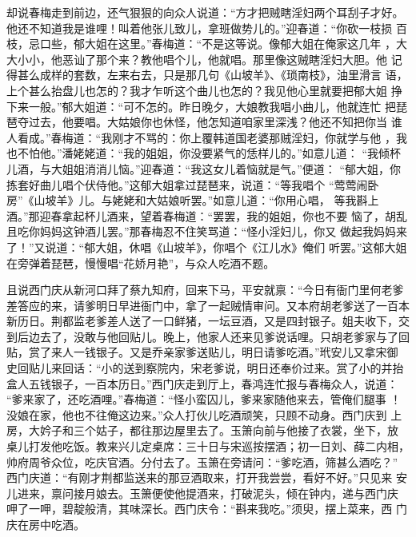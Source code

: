 却说春梅走到前边，还气狠狠的向众人说道：“方才把贼瞎淫妇两个耳刮子才好。
他还不知道我是谁哩！叫着他张儿致儿，拿班做势儿的。”迎春道：“你砍一枝损
百枝，忌口些，郁大姐在这里。”春梅道：“不是这等说。像郁大姐在俺家这几年
，大大小小，他恶讪了那个来？教他唱个儿，他就唱。那里像这贼瞎淫妇大胆。他
记得甚么成样的套数，左来右去，只是那几句《山坡羊》、《琐南枝》，油里滑言
语，上个甚么抬盘儿也怎的？我才乍听这个曲儿也怎的？我见他心里就要把郁大姐
挣下来一般。”郁大姐道：“可不怎的。昨日晚夕，大娘教我唱小曲儿，他就连忙
把琵琶夺过去，他要唱。大姑娘你也休怪，他怎知道咱家里深浅？他还不知把你当
谁人看成。”春梅道：“我刚才不骂的：你上覆韩道国老婆那贼淫妇，你就学与他
，我也不怕他。”潘姥姥道：“我的姐姐，你没要紧气的恁样儿的。”如意儿道：
“我倾杯儿酒，与大姐姐消消儿恼。”迎春道：“我这女儿着恼就是气。”便道：
“郁大姐，你拣套好曲儿唱个伏侍他。”这郁大姐拿过琵琶来，说道：“等我唱个
“莺莺闹卧房”《山坡羊》儿。与姥姥和大姑娘听罢。”如意儿道：“你用心唱，
等我斟上酒。”那迎春拿起杯儿酒来，望着春梅道：“罢罢，我的姐姐，你也不要
恼了，胡乱且吃你妈妈这钟酒儿罢。”那春梅忍不住笑骂道：“怪小淫妇儿，你又
做起我妈妈来了！”又说道：“郁大姐，休唱《山坡羊》，你唱个《江儿水》俺们
听罢。”这郁大姐在旁弹着琵琶，慢慢唱“花娇月艳”，与众人吃酒不题。

且说西门庆从新河口拜了蔡九知府，回来下马，平安就禀：“今日有衙门里何老爹
差答应的来，请爹明日早进衙门中，拿了一起贼情审问。又本府胡老爹送了一百本
新历日。荆都监老爹差人送了一口鲜猪，一坛豆酒，又是四封银子。姐夫收下，交
到后边去了，没敢与他回贴儿。晚上，他家人还来见爹说话哩。只胡老爹家与了回
贴，赏了来人一钱银子。又是乔亲家爹送贴儿，明日请爹吃酒。”玳安儿又拿宋御
史回贴儿来回话：“小的送到察院内，宋老爹说，明日还奉价过来。赏了小的并抬
盒人五钱银子，一百本历日。”西门庆走到厅上，春鸿连忙报与春梅众人，说道：
“爹来家了，还吃酒哩。”春梅道：“怪小蛮囚儿，爹来家随他来去，管俺们腿事
！没娘在家，他也不往俺这边来。”众人打伙儿吃酒顽笑，只顾不动身。西门庆到
上房，大妗子和三个姑子，都往那边屋里去了。玉箫向前与他接了衣裳，坐下，放
桌儿打发他吃饭。教来兴儿定桌席：三十日与宋巡按摆酒；初一日刘、薛二内相，
帅府周爷众位，吃庆官酒。分付去了。玉箫在旁请问：“爹吃酒，筛甚么酒吃？”
西门庆道：“有刚才荆都监送来的那豆酒取来，打开我尝尝，看好不好。”只见来
安儿进来，禀问接月娘去。玉箫便使他提酒来，打破泥头，倾在钟内，递与西门庆
呷了一呷，碧靛般清，其味深长。西门庆令：“斟来我吃。”须臾，摆上菜来，西
门庆在房中吃酒。

